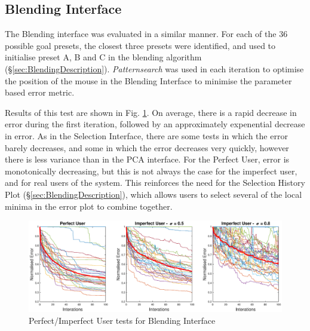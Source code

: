 \documentclass[11pt, oneside]{report}   	%
\begin{document}
\subsection{Blending Interface} \label{sec:BlendingEval}
The Blending interface was evaluated in a similar manner. For each of the 36 possible goal presets, the closest three presets were identified, and used to initialise preset A, B and C in the blending algorithm (\S \ref{sec:BlendingDescription}). \emph{Patternsearch} was used in each iteration to optimise the position of the mouse in the Blending Interface to minimise the parameter based error metric. 

Results of this test are shown in Fig. \ref{fig:BlendingTest1}.
On average, there is a rapid decrease in error during the first iteration, followed by an approximately expenential decrease in error.
As in the Selection Interface, there are some tests in which the error barely decreases, and some in which the error decreases very quickly, however there is less variance than in the PCA interface. For the Perfect User, error is monotonically decreasing, but this is not always the case for the imperfect user, and for real users of the system. This reinforces the need for the Selection History Plot (\S \ref{sec:BlendingDescription}), which allows users to select several of the local minima in the error plot to combine together. 
\begin{figure}[h]
	\hspace{-70pt}
	\includegraphics[width = 8in]{BlendingInterfaceTests1.eps}
	\caption{Perfect/Imperfect User tests for Blending Interface}
	\label{fig:BlendingTest1}
\end{figure}
\end{document}

